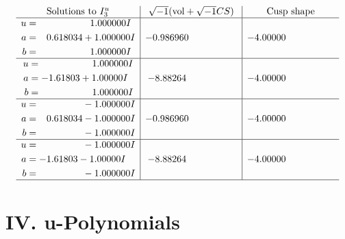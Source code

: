 \documentclass[1p]{elsarticle_modified}
\theoremstyle{definition}
\newcommand{\I}{\sqrt{-1}}
\begin{document}
$$\begin{array}{c|c|c}  
\text{Solutions to }I^u_{3}& \I (\text{vol} + \sqrt{-1}CS) & \text{Cusp shape}\\
 \hline 
\begin{aligned}
u &= \phantom{-0.000000 -}1.000000 I \\
a &= \phantom{-}0.618034 + 1.000000 I \\
b &= \phantom{-0.000000 -}1.000000 I\end{aligned}
 & -0.986960\phantom{ +0.000000I} & -4.00000\phantom{ +0.000000I} \\ \hline\begin{aligned}
u &= \phantom{-0.000000 -}1.000000 I \\
a &= -1.61803 + 1.00000 I \\
b &= \phantom{-0.000000 -}1.000000 I\end{aligned}
 & -8.88264\phantom{ +0.000000I} & -4.00000\phantom{ +0.000000I} \\ \hline\begin{aligned}
u &= \phantom{-0.000000 } -1.000000 I \\
a &= \phantom{-}0.618034 - 1.000000 I \\
b &= \phantom{-0.000000 } -1.000000 I\end{aligned}
 & -0.986960\phantom{ +0.000000I} & -4.00000\phantom{ +0.000000I} \\ \hline\begin{aligned}
u &= \phantom{-0.000000 } -1.000000 I \\
a &= -1.61803 - 1.00000 I \\
b &= \phantom{-0.000000 } -1.000000 I\end{aligned}
 & -8.88264\phantom{ +0.000000I} & -4.00000\phantom{ +0.000000I}\\
 \hline 
 \end{array}$$\newpage
\newpage\renewcommand{\arraystretch}{1}
\centering \section*{ IV. u-Polynomials}
\end{document}

